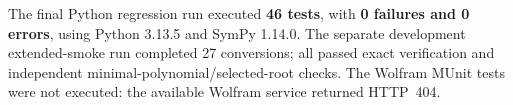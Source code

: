 The final Python regression run executed \textbf{46 tests}, with \textbf{0 failures and 0 errors}, using Python 3.13.5 and SymPy 1.14.0. The separate development extended-smoke run completed 27 conversions; all passed exact verification and independent minimal-polynomial/selected-root checks. The Wolfram MUnit tests were not executed: the available Wolfram service returned HTTP~404.
